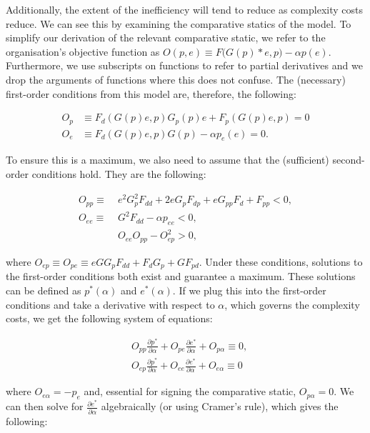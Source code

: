 Additionally, the extent of the inefficiency will tend to reduce as complexity costs reduce. We can see this by examining the comparative statics of the model. To simplify our derivation of the relevant comparative static, we refer to the organisation's objective function as $O(p,e)\equiv F\Big(G(p)*e ,p\Big) - \alpha p(e)$. Furthermore, we use subscripts on functions to refer to partial derivatives and we drop the arguments of functions where this does not confuse. The (necessary) first-order conditions from this model are, therefore, the following:

\begin{align}
O_p & \equiv F_{d}(G(p)e,p)G_p(p)e + F_p(G(p)e,p) = 0 \nonumber \\
O_e & \equiv F_{d}(G(p)e,p)G(p) - \alpha p_e(e) = 0. \nonumber
\end{align}

To ensure this is a maximum, we also need to assume that the (sufficient) second-order conditions hold. They are the following:

\begin{align}
O_{pp} \equiv &\;  e^2G_p^2F_{dd} + 2eG_pF_{dp} + eG_{pp}F_d + F_{pp} < 0, \nonumber \\
O_{ee}  \equiv &\;  G^2F_{dd} - \alpha p_{ee} < 0, \nonumber \\
&  \; O_{ee}O_{pp} - O_{ep}^2 > 0, \nonumber
\end{align}

\noindent where $O_{ep} \equiv O_{pe} \equiv eGG_pF_{dd} + F_dG_p + GF_{pd}$. Under these conditions, solutions to the first-order conditions both exist and guarantee a maximum. These solutions can be defined as $p^*(\alpha)$ and $e^*(\alpha)$. If we plug this into the first-order conditions and take a derivative with respect to $\alpha$, which governs the complexity costs, we get the following system of equations:

\begin{align}
& O_{pp}\frac{\partial p^*}{\partial \alpha} + O_{pe}\frac{\partial e^*}{\partial \alpha} + O_{p\alpha} \equiv 0, \nonumber \\
& O_{ep}\frac{\partial p^*}{\partial \alpha} + O_{ee}\frac{\partial e^*}{\partial \alpha} + O_{e\alpha} \equiv 0  \nonumber
\end{align}

\noindent where $O_{e\alpha} = -p_e$ and, essential for signing the comparative static, $O_{p\alpha} = 0$. We can then solve for $\frac{\partial e^*}{\partial \alpha}$ algebraically (or using Cramer's rule), which gives the following:

